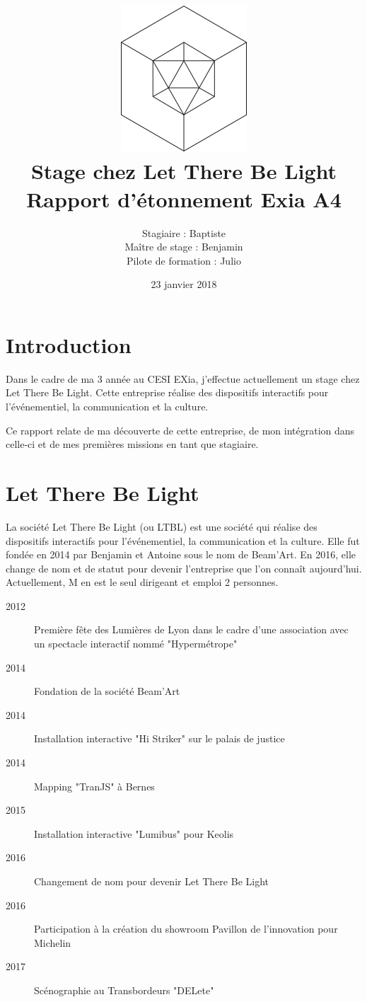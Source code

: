 \documentclass{article}
\title{\includegraphics{logo.png}\vspace{2cm}\\Stage chez Let There Be Light \\ \large Rapport d'étonnement Exia A4}
\date{23 janvier 2018}
\author{Stagiaire : Baptiste \bsc{Saclier} \\ Maître de stage : Benjamin \basc{Petit}\\Pilote de formation : Julio \basc{Santilario}}
\begin{document}
\maketitle

\clearpage

\tableofcontents

\section{Introduction}

Dans le cadre de ma 3 année au CESI EXia, j'effectue actuellement un stage chez Let There Be Light.
Cette entreprise réalise des dispositifs interactifs pour l'événementiel, la communication et la culture.

Ce rapport relate de ma découverte de cette entreprise, de mon intégration dans celle-ci et de mes premières missions en tant que stagiaire.

\clearpage

\section{Let There Be Light}

La société Let There Be Light (ou LTBL) est une société qui réalise des dispositifs interactifs pour l'événementiel, la communication et la culture.
Elle fut fondée en 2014 par Benjamin  et Antoine  sous le nom de Beam'Art.
En 2016, elle change de nom et de statut pour devenir l'entreprise que l'on connaît aujourd'hui.
Actuellement, M  en est le seul dirigeant et emploi 2 personnes.

\begin{description}
    \item[2012] Première fête des Lumières de Lyon dans le cadre d'une association avec un spectacle interactif nommé "Hypermétrope"
    \item[2014] Fondation de la société Beam'Art
    \item[2014] Installation interactive "Hi Striker" sur le palais de justice
    \item[2014] Mapping "TranJS" à Bernes
    \item[2015] Installation interactive "Lumibus" pour Keolis
    \item[2016] Changement de nom pour devenir Let There Be Light
    \item[2016] Participation à la création du showroom Pavillon de l'innovation pour Michelin
    \item[2017] Scénographie au Transbordeurs "DELete"
\end{description}
\end{document}
